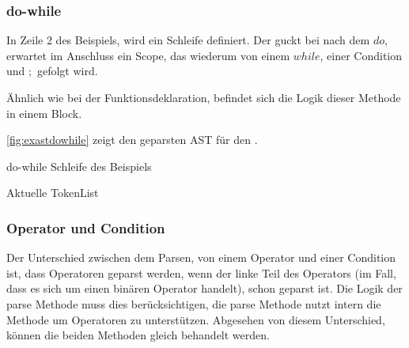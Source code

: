 {{    %
    \subsubsection{do-while}
    \label{sssec:do-while}
      In Zeile 2 des Beispiels, wird ein  Schleife definiert. Der  guckt bei  nach dem \myRIn$do$, erwartet im Anschluss ein Scope, das wiederum von einem \myRIn$while$, einer Condition und \myRIn$;$ gefolgt wird.

      Ähnlich wie bei der Funktionsdeklaration, befindet sich die Logik dieser Methode in einem  Block.

      \autoref{fig:exastdowhile} zeigt den geparsten AST für den .
      \begin{paracol}{2}
        \begin{myCodeEnv}
          \centering
          \begin{myInvBox}[width=.9\linewidth]
            
          \end{myInvBox}
          \caption{do-while Schleife des Beispiels}
          \label{fig:exastdowhile}
        \end{myCodeEnv}
        \switchcolumn
        \begin{myCodeEnv}
          \centering
          \begin{myInvBox}[width=.9\linewidth]
            
          \end{myInvBox}
          \caption*{Aktuelle TokenList}
        \end{myCodeEnv}
      \end{paracol}


    \subsubsection{Operator und Condition}
    \label{sssec:Operator und Condition}
      Der Unterschied zwischen dem Parsen, von einem Operator und einer Condition ist, dass Operatoren geparst werden, wenn der linke Teil des Operators (im Fall, dass es sich um einen binären Operator handelt), schon geparst ist. Die Logik der  parse Methode muss dies berücksichtigen, die  parse Methode nutzt intern die  Methode um Operatoren zu unterstützen. Abgesehen von diesem Unterschied, können die beiden Methoden gleich behandelt werden.

}}
